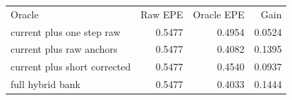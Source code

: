 \begin{tabular}{lrrr}\toprule
Oracle & Raw EPE & Oracle EPE & Gain \\
current plus one step raw & 0.5477 & 0.4954 & 0.0524 \\
current plus raw anchors & 0.5477 & 0.4082 & 0.1395 \\
current plus short corrected & 0.5477 & 0.4540 & 0.0937 \\
full hybrid bank & 0.5477 & 0.4033 & 0.1444 \\
\bottomrule\end{tabular}
